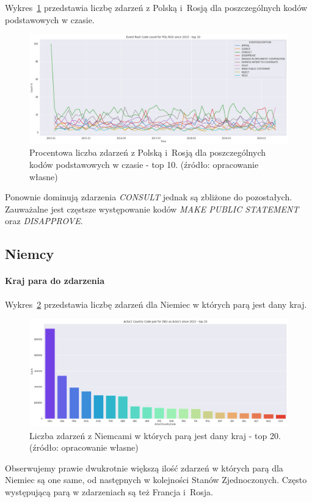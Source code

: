 \documentclass[11pt]{report}
\begin{document}
    Wykres~\ref{fig:PLRUSERC} przedstawia liczbę zdarzeń z Polską i~Rosją dla poszczególnych kodów podstawowych w czasie.
    \begin{figure}[!htp]
        \centering
        \includegraphics[width=\linewidth]{fig/PL/POLRUSERCperc.png}
        \caption{Procentowa liczba zdarzeń z Polską i~Rosją dla poszczególnych kodów podstawowych w czasie - top 10. (źródło: opracowanie własne)}
        \label{fig:PLRUSERC}
    \end{figure}
    Ponownie dominują zdarzenia \textit{CONSULT} jednak są zbliżone do pozostałych.
    Zauważalne jest częstsze występowanie kodów \textit{MAKE PUBLIC STATEMENT} oraz \textit{DISAPPROVE}.

    \subsection{Niemcy}

    \paragraph{Kraj para do zdarzenia}

    Wykres~\ref{fig:DEUpair} przedstawia liczbę zdarzeń dla Niemiec w których parą jest dany kraj.
    \begin{figure}[!htp]
        \centering
        \includegraphics[width=\linewidth]{fig/DEU/DEUactor2Pair.png}
        \caption{Liczba zdarzeń z Niemcami w których parą jest dany kraj - top 20. (źródło: opracowanie własne)}
        \label{fig:DEUpair}
    \end{figure}
    Obserwujemy prawie dwukrotnie większą ilość zdarzeń w których parą dla Niemiec są one same, od następnych w kolejności Stanów Zjednoczonych.
    Często występującą parą w zdarzeniach są też Francja i~Rosja.
\end{document}
